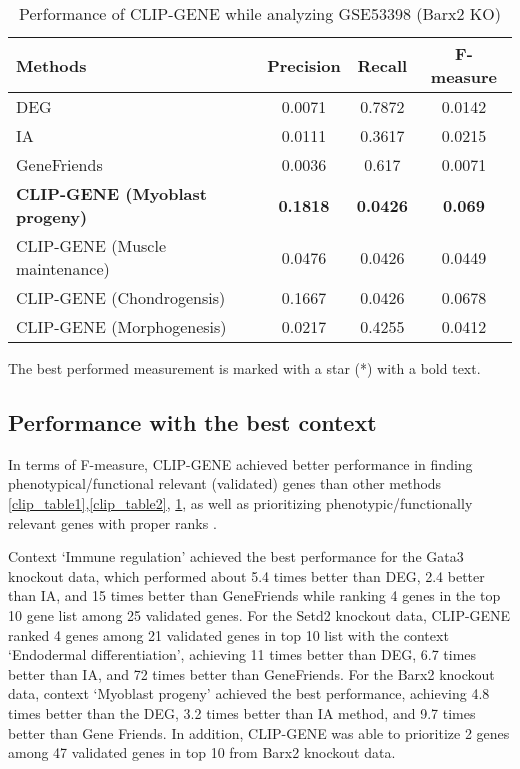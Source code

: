 \documentclass[oneside,phd]{snuthesis}
\begin{document}
\begin{table}
\begin{tabular}{ l cc c  }
\hline
Methods    & Precision  & Recall   & F-measure\\
\hline
DEG & 0.0071 & 0.7872 & 0.0142\\
IA &0.0111 & 0.3617  &0.0215 \\
GeneFriends & 0.0036 &  0.617 & 0.0071 \\
\textbf{CLIP-GENE (Myoblast progeny)} & \textbf{0.1818}  & \textbf{0.0426}   & \textbf{0.069}\\ 
CLIP-GENE (Muscle maintenance) & 0.0476  & 0.0426  & 0.0449\\ 
CLIP-GENE (Chondrogensis) & 0.1667 & 0.0426   & 0.0678\\
CLIP-GENE (Morphogenesis) & 0.0217  & 0.4255   & 0.0412\\
\hline
\end{tabular}
\caption{Performance of CLIP-GENE while analyzing GSE53398 (Barx2 KO)}
\scriptsize{The best performed measurement is marked with a star (*) with a bold text.}
\label{clip_table3}
\end{table}


\subsection{Performance with the best context}
In terms of F-measure, CLIP-GENE achieved better performance in finding phenotypical/functional relevant (validated) genes than other methods \ref{clip_table1},\ref{clip_table2}, \ref{clip_table3}, as well as prioritizing phenotypic/functionally relevant genes with proper ranks \citep{hur2016clip}. 

Context ‘Immune regulation’ achieved the best performance for the Gata3 knockout data, which performed about 5.4 times better than DEG, 2.4 better than IA, and 15 times better than GeneFriends while ranking 4 genes in the top 10 gene list among 25 validated genes. 
For the Setd2 knockout data, CLIP-GENE ranked 4 genes among 21 validated genes in top 10 list with the context ‘Endodermal differentiation’, achieving 11 times better than DEG, 6.7 times better than IA, and 72 times better than GeneFriends. For the Barx2 knockout data, context ‘Myoblast progeny’ achieved the best performance, achieving 4.8 times better than the DEG, 3.2 times better than IA method, and 9.7 times better than Gene Friends. 
In addition, CLIP-GENE was able to prioritize 2 genes among 47 validated genes in top 10 from Barx2 knockout data.
\end{document}
